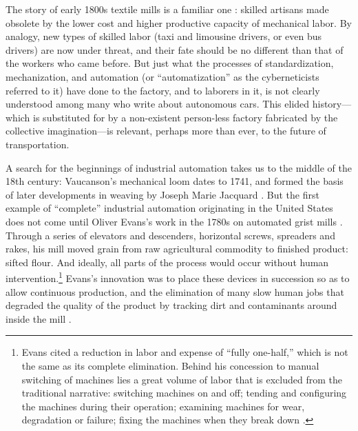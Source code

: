 
The
story of early 1800s textile mills is a familiar one \cite{pewPositive}: skilled artisans made obsolete by the
lower cost and higher productive capacity of mechanical labor. By
analogy, new types of skilled labor (taxi and limousine drivers, or
even bus drivers) are now under threat, and their fate should be no
different than that of the workers who came before. But just what the
processes of standardization, mechanization, and automation (or
``automatization'' as the cyberneticists referred to it) have done to
the factory, and to laborers in it, is 
not clearly understood among many who write about autonomous cars. This
elided history---which is substituted for by a non-existent person-less
factory fabricated by the collective imagination---is relevant, perhaps
more than ever, to the future of transportation.

A search for the beginnings of industrial automation takes us to the middle of
the 18th century: Vaucanson's mechanical loom dates to 1741, and formed the basis of
 later developments in weaving by Joseph Marie Jacquard \cite[p. 9]{dieboldImpact}. 
But the first example of ``complete'' industrial automation originating in the
United States does not come until Oliver Evans's work in the 1780s on
automated grist mills \cite[p. 5]{roesmithYankee}. Through a series of elevators and descenders,
horizontal screws, spreaders and rakes, his mill moved grain from raw
agricultural commodity to finished product: sifted flour. And ideally,
all parts of the process would occur without human
intervention.\footnote{Evans cited a reduction in
  labor and expense of ``fully one-half,'' which is not the same as
  its complete elimination. Behind his concession to manual switching
  of machines lies a great volume of labor that is excluded
  from the traditional narrative: switching machines on and off;
  tending and configuring the machines during their operation; examining machines for
  wear, degradation or failure; fixing the machines when they break
  down \cite{evansMillguide}.}
Evans's innovation was to place these devices 
in succession so as to allow continuous production, and the
elimination of many slow human jobs that degraded the quality of the
product by tracking dirt and contaminants around inside the
mill \cite[p. 203]{evansMillguide}. 

